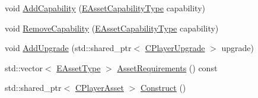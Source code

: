 \begin{DoxyCompactItemize}
\item 
void \hyperlink{classCPlayerAssetType_ae9661ff35f54eedb4b7cd132c4f34174}{Add\+Capability} (\hyperlink{GameDataTypes_8h_a35b98ce26aca678b03c6f9f76e4778ce}{E\+Asset\+Capability\+Type} capability)
\item 
void \hyperlink{classCPlayerAssetType_a87e2ba8eecf6877a42fb9f31df4248bb}{Remove\+Capability} (\hyperlink{GameDataTypes_8h_a35b98ce26aca678b03c6f9f76e4778ce}{E\+Asset\+Capability\+Type} capability)
\item 
void \hyperlink{classCPlayerAssetType_ab5e951dff6a5300ee4f8361359296ebb}{Add\+Upgrade} (std\+::shared\+\_\+ptr$<$ \hyperlink{classCPlayerUpgrade}{C\+Player\+Upgrade} $>$ upgrade)
\item 
std\+::vector$<$ \hyperlink{GameDataTypes_8h_a5600d4fc433b83300308921974477fec}{E\+Asset\+Type} $>$ \hyperlink{classCPlayerAssetType_a8041f92f246b58867a4478b3a47a7b74}{Asset\+Requirements} () const
\item 
std\+::shared\+\_\+ptr$<$ \hyperlink{classCPlayerAsset}{C\+Player\+Asset} $>$ \hyperlink{classCPlayerAssetType_a33174deef7e3b4a79e3a83e502f75d38}{Construct} ()
\end{DoxyCompactItemize}
